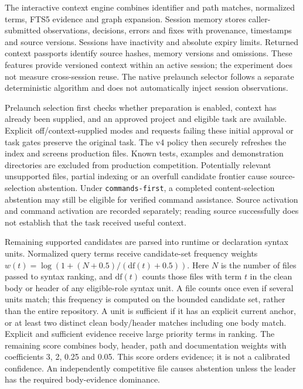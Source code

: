 \documentclass[manuscript,screen,nonacm]{acmart}
\begin{document}
The interactive context engine combines identifier and path matches,
normalized terms, FTS5 evidence and graph expansion. Session memory
stores caller-submitted observations, decisions, errors and fixes with
provenance, timestamps and source versions. Sessions have inactivity and
absolute expiry limits. Returned context passports identify source
hashes, memory versions and omissions. These features provide versioned
context within an active session; the experiment does not measure
cross-session reuse. The native prelaunch selector follows a separate
deterministic algorithm and does not automatically inject session
observations.

Prelaunch selection first checks whether preparation is enabled, context
has already been supplied, and an approved project and eligible task are
available. Explicit off/context-supplied modes and requests failing
these initial approval or task gates preserve the original task. The v4
policy then securely refreshes the index and screens production files.
Known tests, examples and demonstration directories are excluded from
production competition. Potentially relevant unsupported files, partial
indexing or an overfull candidate frontier cause source-selection
abstention. Under \texttt{commands-first}, a completed content-selection
abstention may still be eligible for verified command assistance. Source
activation and command activation are recorded separately; reading
source successfully does not establish that the task received useful
context.

Remaining supported candidates are parsed into runtime or declaration
syntax units. Normalized query terms receive candidate-set frequency
weights \(w(t)=\log(1+(N+0.5)/(\mathrm{df}(t)+0.5))\). Here \(N\) is the
number of files passed to syntax ranking, and \(\mathrm{df}(t)\) counts
those files with term \(t\) in the clean body or header of any
eligible-role syntax unit. A file counts once even if several units
match; this frequency is computed on the bounded candidate set, rather
than the entire repository. A unit is sufficient if it has an explicit
current anchor, or at least two distinct clean body/header matches
including one body match. Explicit and sufficient evidence receive large
priority terms in ranking. The remaining score combines body, header,
path and documentation weights with coefficients 3, 2, 0.25 and 0.05.
This score orders evidence; it is not a calibrated confidence. An
independently competitive file causes abstention unless the leader has
the required body-evidence dominance.
\end{document}
